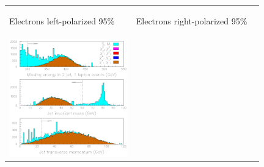 \documentclass[landscape]{article}
\begin{document}
\huge
\renewcommand{\labelitemi}{-}
\setlength{\parindent}{0 cm}

\begin{figure}[!ht]
  \begin{center}
    \begin{tabular}{p{0.49\linewidth} p{0.49\linewidth}}
      \begin{minipage}{\linewidth} \begin{center} Electrons left-polarized 95\% \end{center} \end{minipage} &
      \begin{minipage}{\linewidth} \begin{center} Electrons right-polarized 95\% \end{center} \end{minipage} \\
      \begin{minipage}{\linewidth} \includegraphics[width=\linewidth]{charginos_left.pdf} \end{minipage} &

\end{tabular}
\end{center}
\end{figure}
\end{document}
